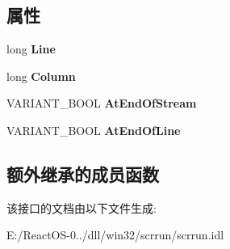 \subsection*{属性}
\begin{DoxyCompactItemize}
\item 
\mbox{\label{interface_scripting_1_1_i_text_stream_ac0e85673b546f943adc5630e3033bcee}} 
long {\bfseries Line}
\item 
\mbox{\label{interface_scripting_1_1_i_text_stream_ac4cbdaa5e98f0b02638f4357d5e5ac04}} 
long {\bfseries Column}
\item 
\mbox{\label{interface_scripting_1_1_i_text_stream_aab9e9c2250b580b9671c1d166d2bbc3d}} 
V\+A\+R\+I\+A\+N\+T\+\_\+\+B\+O\+OL {\bfseries At\+End\+Of\+Stream}
\item 
\mbox{\label{interface_scripting_1_1_i_text_stream_a7e5f1c04ab2381e583bc14df44cf1cd4}} 
V\+A\+R\+I\+A\+N\+T\+\_\+\+B\+O\+OL {\bfseries At\+End\+Of\+Line}
\end{DoxyCompactItemize}
\subsection*{额外继承的成员函数}


该接口的文档由以下文件生成\+:\begin{DoxyCompactItemize}
\item 
E\+:/\+React\+O\+S-\/0../dll/win32/scrrun/scrrun.\+idl\end{DoxyCompactItemize}
